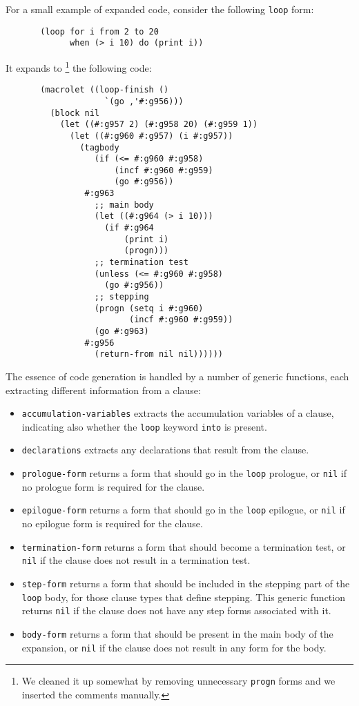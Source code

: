 \noindent
For a small example of expanded code, consider the following
\texttt{loop} form:

{\small\begin{verbatim}
       (loop for i from 2 to 20 
             when (> i 10) do (print i))
\end{verbatim}}

\noindent
It expands to%
\footnote{We cleaned it up somewhat by removing unnecessary
  \texttt{progn} forms and we inserted the comments manually.}
the following code:

{\small\begin{verbatim}
       (macrolet ((loop-finish ()
                    `(go ,'#:g956)))
         (block nil
           (let ((#:g957 2) (#:g958 20) (#:g959 1))
             (let ((#:g960 #:g957) (i #:g957))
               (tagbody
                  (if (<= #:g960 #:g958)
                      (incf #:g960 #:g959)
                      (go #:g956))
                #:g963
                  ;; main body
                  (let ((#:g964 (> i 10)))
                    (if #:g964
                        (print i)
                        (progn)))
                  ;; termination test
                  (unless (<= #:g960 #:g958)
                    (go #:g956))
                  ;; stepping
                  (progn (setq i #:g960) 
                         (incf #:g960 #:g959))
                  (go #:g963)
                #:g956
                  (return-from nil nil))))))
\end{verbatim}}

The essence of code generation is handled by a number of generic
functions, each extracting different information from a clause:

\begin{itemize}
\item \texttt{accumulation-variables} extracts the accumulation
  variables of a clause, indicating also whether the \texttt{loop}
  keyword \texttt{into} is present.
\item \texttt{declarations} extracts any declarations that result from
  the clause.
\item \texttt{prologue-form} returns a form that should go in the
  \texttt{loop} prologue, or \texttt{nil} if no prologue form is
  required for the clause.
\item \texttt{epilogue-form} returns a form that should go in the
  \texttt{loop} epilogue, or \texttt{nil} if no epilogue form is
  required for the clause.
\item \texttt{termination-form} returns a form that should become a
  termination test, or \texttt{nil} if the clause does not result in a
  termination test.
\item \texttt{step-form} returns a form that should be included in the
  stepping part of the \texttt{loop} body, for those clause types that
  define stepping.  This generic function returns \texttt{nil} if the
  clause does not have any step forms associated with it.
\item \texttt{body-form} returns a form that should be present in the
  main body of the expansion, or \texttt{nil} if the clause does not
  result in any form for the body.
\end{itemize}

